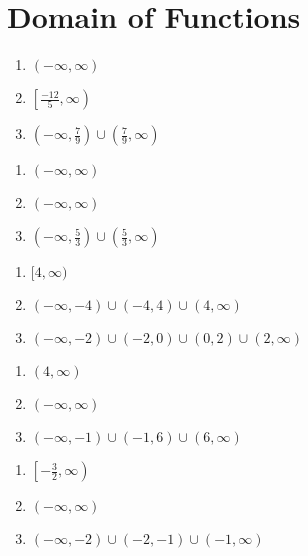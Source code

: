 \section*{Domain of Functions}

\begin{multicols}{3}
\begin{enumerate}
	\item $(-\infty, \infty)$
	\item $\left[\frac{-12}{5}, \infty\right)$
	\item $\left(-\infty, \frac{7}{9}\right) \cup \left(\frac{7}{9}, \infty\right)$
\end{enumerate}	\setcounter{Review}{\value{enumi}}
\end{multicols}
\begin{multicols}{3}
\begin{enumerate}	\setcounter{enumi}{\value{Review}}
	\item $(-\infty, \infty)$
	\item $(-\infty, \infty)$
	\item $\left(-\infty, \frac{5}{3}\right) \cup \left(\frac{5}{3}, \infty\right)$
\end{enumerate}	\setcounter{Review}{\value{enumi}}
\end{multicols}
\begin{multicols}{3}
\begin{enumerate}	\setcounter{enumi}{\value{Review}}
	\item $[4, \infty)$
	\item $(-\infty, -4) \cup (-4, 4) \cup (4, \infty)$
	\item $(-\infty, -2) \cup (-2, 0) \cup (0,2) \cup (2, \infty)$
\end{enumerate}	\setcounter{Review}{\value{enumi}}
\end{multicols}
\begin{multicols}{3}
\begin{enumerate}	\setcounter{enumi}{\value{Review}}
	\item $(4, \infty)$
	\item $(-\infty, \infty)$
	\item $(-\infty, -1) \cup (-1, 6) \cup (6, \infty)$
\end{enumerate}	\setcounter{Review}{\value{enumi}}
\end{multicols}
\begin{multicols}{3}
\begin{enumerate}	\setcounter{enumi}{\value{Review}}
	\item $\left[-\frac{3}{2}, \infty\right)$
	\item $(-\infty, \infty)$
	\item $(-\infty, -2) \cup (-2,-1) \cup (-1,\infty)$
\end{enumerate}	\setcounter{Review}{\value{enumi}}
\end{multicols}
